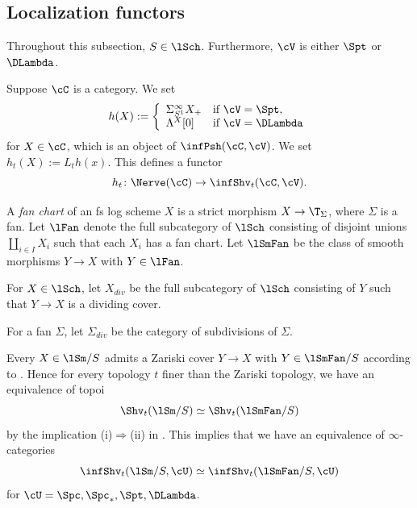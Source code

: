 \documentclass[10pt]{amsart}
\begin{document}
\subsection{Localization functors}
\label{localization}

Throughout this subsection, $S\in \lSch$.
Furthermore, $\cV$ is either $\Spt$ or $\DLambda$.

Suppose $\cC$ is a category.
We set
\[
h(X)
:=
\left\{
\begin{array}{ll}
\Sigma_{S^1}^\infty X_+ & \text{if }\cV=\Spt,
\\
\Lambda^X[0] & \text{if }\cV=\DLambda
\end{array}
\right.
\]
for $X\in \cC$, which is an object of $\infPsh(\cC,\cV)$.
We set $h_t(X):=L_t h(x)$.
This defines a functor
\[
h_t\colon \Nerve(\cC) \to \infShv_t(\cC,\cV).
\]








\begin{df}
A \emph{fan chart} of an fs log scheme $X$ is a strict morphism $X\to \T_{\Sigma}$, where $\Sigma$ is a fan.
Let $\lFan$ denote the full subcategory of $\lSch$ consisting of disjoint unions $\amalg_{i\in I} X_i$ such that each $X_i$ has a fan chart.
Let $\lSmFan$ be the class of smooth morphisms $Y\to X$ with $Y\in \lFan$. 

For $X\in \lSch$, let $X_{div}$ be the full subcategory of $\lSch$ consisting of $Y$ such that $Y\to X$ is a dividing cover.

For a fan $\Sigma$, let $\Sigma_{div}$ be the category of subdivisions of $\Sigma$.
\end{df}

Every $X\in \lSm/S$ admits a Zariski cover $Y\to X$ with $Y\in \lSmFan/S$ according to \cite[Proposition II.2.3.7]{Ogu}.
Hence for every topology $t$ finer than the Zariski topology, we have an equivalence of topoi
\[
\Shv_t(\lSm/S)
\simeq
\Shv_t(\lSmFan/S)
\]
by the implication (i)$\Rightarrow$(ii) in \cite[Th\'eor\`eme III.4.1]{SGA4}.
This implies that we have an equivalence of $\infty$-categories
\begin{equation}
\infShv_t(\lSm/S,\cU)
\simeq
\infShv_t(\lSmFan/S,\cU)
\end{equation}
for $\cU=\Spc,\Spc_*,\Spt,\DLambda$.
\end{document}
